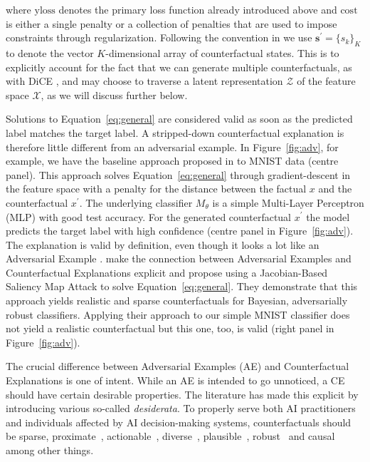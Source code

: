 \documentclass{article}
\begin{document}
where $\text{yloss}$ denotes the primary loss function already introduced above and $\text{cost}$ is either a single penalty or a collection of penalties that are used to impose constraints through regularization. Following the convention in \citet{altmeyer2023endogenous} we use $\mathbf{s}^\prime=\{ s_k\}_K$ to denote the vector $K$-dimensional array of counterfactual states. This is to explicitly account for the fact that we can generate multiple counterfactuals, as with DiCE \citep{mothilal2020explaining}, and may choose to traverse a latent representation $\mathcal{Z}$ of the feature space $\mathcal{X}$, as we will discuss further below. 

Solutions to Equation~\ref{eq:general} are considered valid as soon as the predicted label matches the target label. A stripped-down counterfactual explanation is therefore little different from an adversarial example. In Figure~\ref{fig:adv}, for example, we have the baseline approach proposed in \citet{wachter2017counterfactual} to MNIST data (centre panel). This approach solves Equation~\ref{eq:general} through gradient-descent in the feature space with a penalty for the distance between the factual $x$ and the counterfactual $x^{\prime}$. The underlying classifier $M_{\theta}$ is a simple Multi-Layer Perceptron (MLP) with good test accuracy. For the generated counterfactual $x^{\prime}$ the model predicts the target label with high confidence (centre panel in Figure~\ref{fig:adv}). The explanation is valid by definition, even though it looks a lot like an Adversarial Example \citep{goodfellow2014explaining}. \citet{schut2021generating} make the connection between Adversarial Examples and Counterfactual Explanations explicit and propose using a Jacobian-Based Saliency Map Attack to solve Equation~\ref{eq:general}. They demonstrate that this approach yields realistic and sparse counterfactuals for Bayesian, adversarially robust classifiers. Applying their approach to our simple MNIST classifier does not yield a realistic counterfactual but this one, too, is valid (right panel in Figure~\ref{fig:adv}). 

The crucial difference between Adversarial Examples (AE) and Counterfactual Explanations is one of intent. While an AE is intended to go unnoticed, a CE should have certain desirable properties. The literature has made this explicit by introducing various so-called \textit{desiderata}. To properly serve both AI practitioners and individuals affected by AI decision-making systems, counterfactuals should be sparse, proximate~\citep{wachter2017counterfactual}, actionable~\citep{ustun2019actionable}, diverse~\citep{mothilal2020explaining}, plausible~\citep{joshi2019realistic,poyiadzi2020face,schut2021generating}, robust~\citep{upadhyay2021robust,pawelczyk2022probabilistically,altmeyer2023endogenous} and causal~\citep{karimi2021algorithmic} among other things. 
\end{document}
